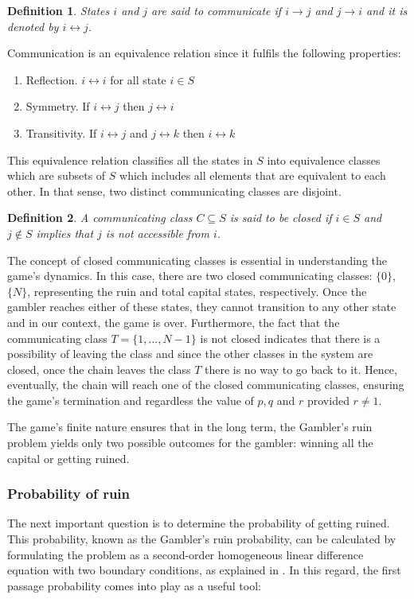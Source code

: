 \documentclass[11pt,twoside]{article}
\newtheorem{Definition}{Definition}
\numberwithin{Theorem}{section}
\numberwithin{Definition}{section}
\numberwithin{Lemma}{section}
\numberwithin{Algorithm}{section}
\numberwithin{equation}{section}
\begin{document}
\begin{Definition} States $i$ and $j$ are said to communicate if $i \rightarrow j$ and $j \rightarrow i$ and it is denoted by $i \leftrightarrow j$.
\end{Definition}

Communication is an equivalence relation since it fulfils the following properties:
\begin{enumerate}
    \item Reflection. $i \leftrightarrow i$ for all state $i \in S$
    \item Symmetry. If $i \leftrightarrow j$ then $j \leftrightarrow i$
    \item Transitivity. If $i \leftrightarrow j$ and $j \leftrightarrow k$ then $i \leftrightarrow k$
\end{enumerate}

This equivalence relation classifies all the states in $S$ into equivalence classes which are subsets of $S$ which includes all elements that are equivalent to each other. In that sense, two distinct communicating classes are disjoint.

\begin{Definition}
A communicating class $C \subseteq S$ is said to be closed if $i\in S$ and $j\notin S$ implies that $j$ is not accessible from $i$.
\end{Definition}

The concept of closed communicating classes is essential in understanding the game's dynamics. In this case, there are two closed communicating classes: $\{0\}$, $\{N\}$, representing the ruin and total capital states, respectively. Once the gambler reaches either of these states, they cannot transition to any other state and in our context, the game is over. Furthermore, the fact that the communicating class $T=\{1,...,N-1\}$ is not closed indicates that there is a possibility of leaving the class and since the other classes in the system are closed, once the chain leaves the class $T$ there is no way to go back to it.  Hence, eventually, the chain will reach one of the closed communicating classes, ensuring the game's termination and regardless the value of $p,q$ and $r$ provided $r\neq 1$.

The game's finite nature ensures that in the long term, the Gambler's ruin problem yields only two possible outcomes for the gambler: winning all the capital or getting ruined. 

\subsubsection{Probability of ruin}
The next important question is to determine the probability of getting ruined. This probability, known as the Gambler's ruin probability, can be calculated by formulating the problem as a second-order homogeneous linear difference equation with two boundary conditions, as explained in \cite{feller}. In this regard, the first passage probability comes into play as a useful tool:
\end{document}

